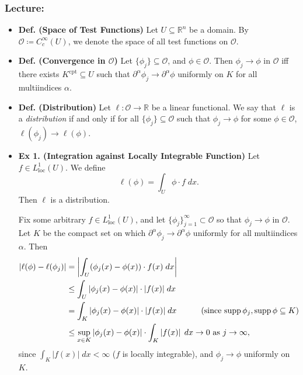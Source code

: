 \documentclass{article}
\begin{document}
\subsubsection{Lecture:} 
\begin{itemize}
		\item \textbf{Def. (Space of Test Functions)} Let $U \subseteq \mathbb{R}^{n}$ be a domain. By $\mathcal{O} \coloneqq C_{c}^{\infty}(U)$, we denote the space of all test functions on $\mathcal{O}$. 
		\item \textbf{Def. (Convergence in $\mathcal{O}$)} Let $\{\phi_{j}\} \subseteq \mathcal{O}$, and $\phi \in \mathcal{O}$. Then $\phi_{j} \to \phi$ in $\mathcal{O}$ iff there exists $K^{\text{cpt}} \subseteq U$ such that $\partial^{\alpha}\phi_{j} \to \partial^{\alpha}\phi$ uniformly on $K$ for all multiindices $\alpha$. 
		\item \textbf{Def. (Distribution)} Let $\ell: \mathcal{O} \to \mathbb{R}$ be a linear functional. We say that $\ell$ is a \textit{distribution} if and only if for all $\{\phi_{j}\} \subseteq \mathcal{O}$ such that $\phi_{j} \to\phi$ for some $\phi \in \mathcal{O}$, $\ell(\phi_{j}) \to \ell(\phi)$. 
		
		\item \textbf{Ex 1. (Integration against Locally Integrable Function)} Let $f \in L^{1}_{\text{loc}}(U)$. We define 
		\begin{equation}
			\ell(\phi)= \int_{U}\phi \cdot f\;dx. 
		\end{equation}
		Then $\ell$ is a distribution. 
		
		{\color{orange}
			Fix some arbitrary $f \in L^{1}_{\text{loc}}(U)$, and let $\{\phi_{j}\}_{j = 1}^{\infty} \subset \mathcal{O}$ so that $\phi_{j} \to \phi$ in $\mathcal{O}$. Let $K$ be the compact set on which $\partial^{\alpha}\phi_{j} \to \partial^{\alpha}\phi$ uniformly for all multiindices $\alpha$. Then 
			\begin{align}
				\begin{split}
					\left| \ell(\phi) - \ell(\phi_{j}) \right| &= \left| \int_{U}(\phi_{j}(x) - \phi(x))\cdot f(x)\;dx \right| \\
					&\leq \int_{U}|\phi_{j}(x) - \phi(x)|\cdot |f(x)|\;dx \\
					&= \int_{K}|\phi_{j}(x) - \phi(x)|\cdot |f(x)|\;dx \qquad \quad \text{(since $\operatorname{supp}{\phi_{j}}, \operatorname{supp}{\phi} \subseteq K$)}\\
					&\leq \sup_{x \in K}|\phi_{j}(x) - \phi(x)| \cdot \int_{K}\left| f(x) \right|\;dx \to 0 \text{ as $j \to \infty$}, 
				\end{split}
			\end{align}
			since $\int_{K}|f(x)|\;dx < \infty$ ($f$ is locally integrable), and $\phi_{j} \to \phi$ uniformly on $K$. 
		}
		

\end{itemize}
\end{document}
